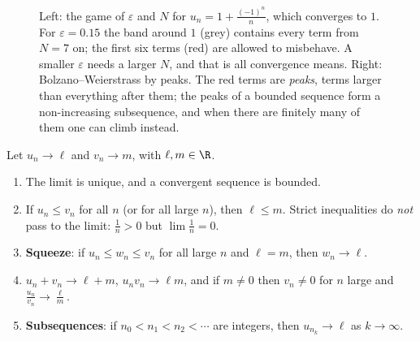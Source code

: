 \begin{figure}[ht]
\centering
{}
\caption{Left: the game of $\varepsilon$ and $N$ for $u_n=1+\frac{(-1)^n}{n}$, which converges to $1$. For $\varepsilon=0.15$ the band around $1$ (grey) contains every term from $N=7$ on; the first six terms (red) are allowed to misbehave. A smaller $\varepsilon$ needs a larger $N$, and that is all convergence means. Right: Bolzano--Weierstrass by peaks. The red terms are \emph{peaks}, terms larger than everything after them; the peaks of a bounded sequence form a non-increasing subsequence, and when there are finitely many of them one can climb instead.}
\label{fig:epsilon}
\end{figure}

\begin{propositionx}
Let $u_n\to\ell$ and $v_n\to m$, with $\ell,m\in\R$.
\begin{enumerate}[label=(\alph*)]
\item The limit is unique, and a convergent sequence is bounded.
\item If $u_n\le v_n$ for all $n$ (or for all large $n$), then $\ell\le m$. Strict inequalities do \emph{not} pass to the limit: $\frac1n>0$ but $\lim\frac1n=0$.
\item \textbf{Squeeze}: if $u_n\le w_n\le v_n$ for all large $n$ and $\ell=m$, then $w_n\to\ell$.
\item $u_n+v_n\to\ell+m$, $u_nv_n\to\ell m$, and if $m\ne0$ then $v_n\ne0$ for $n$ large and $\frac{u_n}{v_n}\to\frac\ell m$.
\item \textbf{Subsequences}: if $n_0<n_1<n_2<\cdots$ are integers, then $u_{n_k}\to\ell$ as $k\to\infty$.
\end{enumerate}
\end{propositionx}
